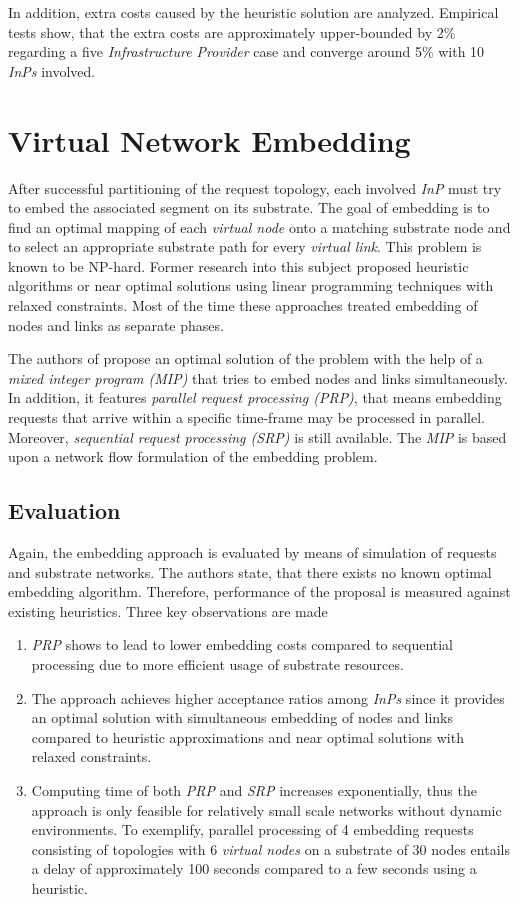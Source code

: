 \documentclass[prodmode,acmtomccap]{acmlarge}
\begin{document}
In addition, extra costs caused by the heuristic solution are analyzed. Empirical tests show, that the extra costs are approximately upper-bounded by 2\% regarding a five \emph{Infrastructure Provider} case and
converge around 5\% with 10 \emph{InPs} involved.

\section{Virtual Network Embedding}
\label{sec:embedding}
After successful partitioning of the request topology, each involved \emph{InP} must try to embed the associated segment on its substrate.
The goal of embedding is to find an optimal mapping of each \emph{virtual node} onto a matching substrate node and to select an appropriate substrate path for every \emph{virtual link}.
This problem is known to be NP-hard. Former research into this subject proposed heuristic algorithms or near optimal solutions using linear programming techniques with
relaxed constraints. Most of the time these approaches treated embedding of nodes and links as separate phases.

The authors of  propose an optimal solution of the problem with the help of a \emph{mixed integer program (MIP)} that tries to embed nodes and links simultaneously. In addition,
it features \emph{parallel request processing (PRP)}, that means embedding requests that arrive within a specific time-frame may be processed in parallel. Moreover,
\emph{sequential request processing (SRP)} is still available.
The \emph{MIP} is based upon a network flow formulation of the embedding problem.

\subsection{Evaluation}
Again, the embedding approach is evaluated by means of simulation of requests and substrate networks. The authors state, that there exists no known optimal embedding algorithm. Therefore, performance of the proposal
is measured against existing heuristics. Three key observations are made

\begin{enumerate}
	\item \emph{PRP} shows to lead to lower embedding costs compared to sequential processing due to more efficient usage of substrate resources.
	\item  The approach achieves higher acceptance ratios among \emph{InPs} since it provides an optimal solution with simultaneous embedding of nodes and links
		compared to heuristic approximations and near optimal solutions with relaxed constraints.
	\item Computing time of both \emph{PRP} and \emph{SRP} increases exponentially, thus the approach is only feasible for relatively small scale networks without dynamic environments.
		To exemplify, parallel processing of 4 embedding requests consisting of topologies with 6 \emph{virtual nodes} on a substrate of 30 nodes entails a delay of approximately 100 seconds
		compared to a few seconds using a heuristic.
\end{enumerate}
\end{document}
